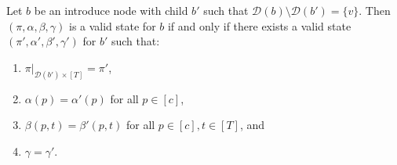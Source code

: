 \documentclass[runningheads]{llncs}
\begin{document}
\begin{lemma} \label{lem:tw intro}
    Let $b$ be an introduce node with child $b'$ such that $\mathcal{D}(b)\setminus\mathcal{D}(b')=\{v\}$. Then $(\pi,\alpha,\beta,\gamma)$ is a valid state for $b$ if and only if there exists a valid state  $(\pi',\alpha',\beta',\gamma')$ for $b'$ such that:
    \begin{enumerate}
    \item $\pi| _{\mathcal{D}(b')\times [T]}=\pi'$,
        \item $\alpha(p)=\alpha'(p)$ for all $p\in [c]$,
        \item $ \beta(p,t)=\beta'(p,t)$ for all $p \in [c], t\in [T]$, and
        \item $\gamma=\gamma'$.
    \end{enumerate} 
\end{lemma}
\end{document}
